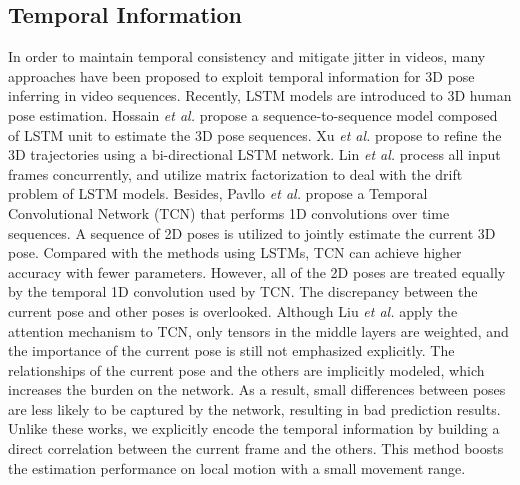 \documentclass[sigconf]{acmart}
\begin{document}
\subsection{Temporal Information}
In order to maintain temporal consistency and mitigate jitter in videos, many approaches \cite{cai2019exploiting,xu2020deep,hossain2018exploiting,lin2017recurrent,lin2019trajectory,jllo20193d,liu2020attention,wang2020motion,mehta2017vnect} have been proposed to exploit temporal information for 3D pose inferring in video sequences. Recently, LSTM models \cite{hochreiter1997long} are introduced to 3D human pose estimation. Hossain \textit{et al.} \cite{hossain2018exploiting} propose a sequence-to-sequence model composed of LSTM unit to estimate the 3D pose sequences. Xu \textit{et al.} \cite{xu2020deep} propose to refine the 3D trajectories using a bi-directional LSTM network. Lin \textit{et al.} \cite{lin2019trajectory} process all input frames concurrently, and utilize matrix factorization to deal with the drift problem of LSTM models. Besides, Pavllo \textit{et al.} \cite{jllo20193d} propose a Temporal Convolutional Network (TCN) that performs 1D convolutions over time sequences. A sequence of 2D poses is utilized to jointly estimate the current 3D pose. Compared with the methods using LSTMs, TCN can achieve higher accuracy with fewer parameters. However, all of the 2D poses are treated equally by the temporal 1D convolution used by TCN. The discrepancy between the current pose and other poses is overlooked. Although Liu \textit{et al.} \cite{liu2020attention} apply the attention mechanism to TCN, only tensors in the middle layers are weighted, and the importance of the current pose is still not emphasized explicitly. The relationships of the current pose and the others are implicitly modeled, which increases the burden on the network. As a result, small differences between poses are less likely to be captured by the network, resulting in bad prediction results. Unlike these works, we explicitly encode the temporal information by building a direct correlation between the current frame and the others. This method boosts the estimation performance on local motion with a small movement range.
\end{document}
